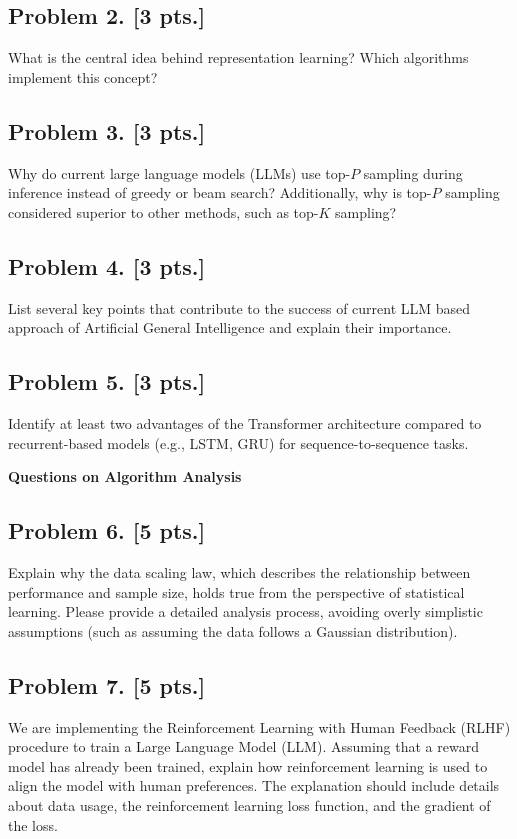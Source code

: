 \documentclass[11pt,a4paper]{article}
\theoremstyle{definition}
\begin{document}
\subsection{Problem 2. [3 pts.]}\label{prob:spr2025-nlp-2}
What is the central idea behind representation learning? Which algorithms implement this concept?

\subsection{Problem 3. [3 pts.]}\label{prob:spr2025-nlp-3}
Why do current large language models (LLMs) use top-$P$ sampling during inference instead of greedy or beam search? Additionally, why is top-$P$ sampling considered superior to other methods, such as top-$K$ sampling?

\subsection{Problem 4. [3 pts.]}\label{prob:spr2025-nlp-4}
List several key points that contribute to the success of current LLM based approach of Artificial General Intelligence and explain their importance.

\subsection{Problem 5. [3 pts.]}\label{prob:spr2025-nlp-5}
Identify at least two advantages of the Transformer architecture compared to recurrent-based models (e.g., LSTM, GRU) for sequence-to-sequence tasks.

\noindent\textbf{Questions on Algorithm Analysis}

\subsection{Problem 6. [5 pts.]}\label{prob:spr2025-nlp-6}
Explain why the data scaling law, which describes the relationship between performance and sample size, holds true from the perspective of statistical learning. Please provide a detailed analysis process, avoiding overly simplistic assumptions (such as assuming the data follows a Gaussian distribution).

\subsection{Problem 7. [5 pts.]}\label{prob:spr2026-rlhf}\label{prob:spr2025-nlp-7}
We are implementing the Reinforcement Learning with Human Feedback (RLHF) procedure to train a Large Language Model (LLM). Assuming that a reward model has already been trained, explain how reinforcement learning is used to align the model with human preferences. The explanation should include details about data usage, the reinforcement learning loss function, and the gradient of the loss.
\end{document}
